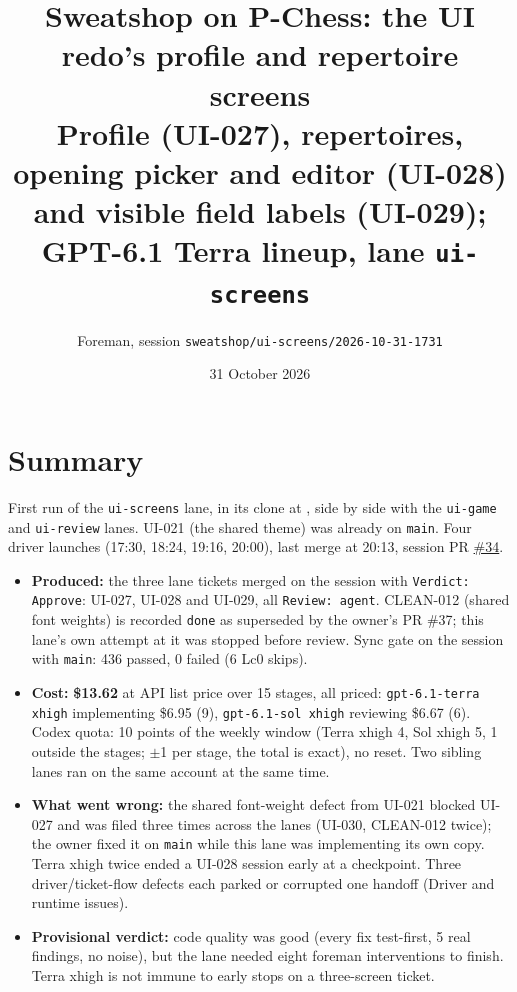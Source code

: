 \documentclass[11pt,a4paper]{article}
\title{Sweatshop on P-Chess: the UI redo's profile and repertoire screens\\\large Profile (UI-027), repertoires, opening picker and editor (UI-028) and visible field labels (UI-029); GPT-6.1 Terra lineup, lane \texttt{ui-screens}}
\author{Foreman, session \texttt{sweatshop/ui-screens/2026-10-31-1731}}
\date{31 October 2026}
\begin{document}
\maketitle

\section*{Summary}

First run of the \texttt{ui-screens} lane, in its clone at ,
side by side with the \texttt{ui-game} and \texttt{ui-review} lanes. UI-021 (the shared theme) was
already on \texttt{main}. Four driver launches (17:30, 18:24, 19:16, 20:00), last merge at 20:13,
session PR \href{https://github.com/Laginho/P-Chess/pull/34}{\#34}.

\begin{itemize}
  \item \textbf{Produced:} the three lane tickets merged on the session with
        \texttt{Verdict: Approve}: UI-027, UI-028 and UI-029, all \texttt{Review: agent}. CLEAN-012
        (shared font weights) is recorded \texttt{done} as superseded by the owner's PR \#37; this
        lane's own attempt at it was stopped before review. Sync gate on the session with
        \texttt{main}: 436 passed, 0 failed (6 Lc0 skips).
  \item \textbf{Cost:} \textbf{\$13.62} at API list price over 15 stages, all priced:
        \texttt{gpt-6.1-terra xhigh} implementing \$6.95 (9), \texttt{gpt-6.1-sol xhigh} reviewing
        \$6.67 (6). Codex quota: 10 points of the weekly window (Terra xhigh 4, Sol xhigh 5,
        1 outside the stages; $\pm$1 per stage, the total is exact), no reset. Two sibling lanes ran
        on the same account at the same time.
  \item \textbf{What went wrong:} the shared font-weight defect from UI-021 blocked UI-027 and was
        filed three times across the lanes (UI-030, CLEAN-012 twice); the owner fixed it on
        \texttt{main} while this lane was implementing its own copy. Terra xhigh twice ended a
        UI-028 session early at a checkpoint. Three driver/ticket-flow defects each parked or
        corrupted one handoff (Driver and runtime issues).
  \item \textbf{Provisional verdict:} code quality was good (every fix test-first, 5 real
        findings, no noise), but the lane needed eight foreman interventions to finish. Terra xhigh
        is not immune to early stops on a three-screen ticket.
\end{itemize}
\end{document}
